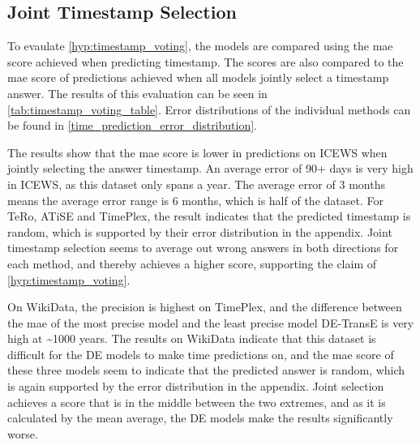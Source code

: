 \subsection{Joint Timestamp Selection}
\label{seubsec:timestamp_voting_experiment}



To evaulate \autoref{hyp:timestamp_voting}, the models are compared using the \gls{mae} score achieved when predicting timestamp. The scores are also compared to the \gls{mae} score of predictions achieved when all models jointly select a timestamp answer. The results of this evaluation can be seen in \autoref{tab:timestamp_voting_table}. Error distributions of the individual methods can be found in \autoref{time_prediction_error_distribution}.

The results show that the \gls{mae} score is lower in predictions on ICEWS when jointly selecting the answer timestamp. An average error of 90+ days is very high in ICEWS, as this dataset only spans a year. The average error of 3 months means the average error range is 6 months, which is half of the dataset.
For TeRo, ATiSE and TimePlex, the result indicates that the predicted timestamp is random, which is supported by their error distribution in the appendix. Joint timestamp selection seems to average out wrong answers in both directions for each method, and thereby achieves a higher score, supporting the claim of \autoref{hyp:timestamp_voting}. 

On WikiData, the precision is highest on TimePlex, and the difference between the \gls{mae} of the most precise model and the least precise model DE-TransE is very high at \textasciitilde1000 years. The results on WikiData indicate that this dataset is difficult for the DE models to make time predictions on, and the \gls{mae} score of these three models seem to indicate that the predicted answer is random, which is again supported by the error distribution in the appendix. Joint selection achieves a score that is in the middle between the two extremes, and as it is calculated by the mean average, the DE models make the results significantly worse. 

